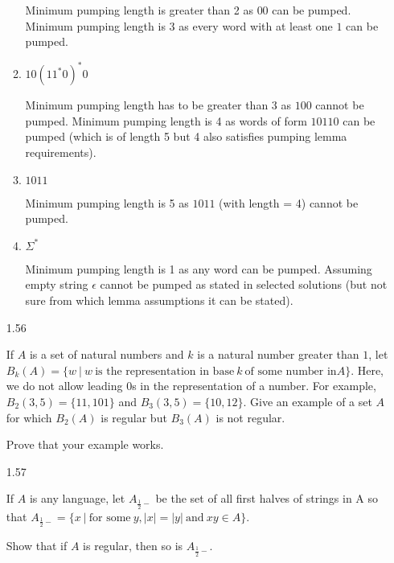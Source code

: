 \begin{enumerate}
\begin{enumerate}
                        Minimum pumping length is greater than 2 as $00$ can be pumped. Minimum pumping length is 3 as every word with at least one $1$ can be pumped.
                        
                  \item $10(11^\ast0)^\ast0$
                        
                        Minimum pumping length has to be greater than 3 as $100$ cannot be pumped. Minimum pumping length is 4 as words of form $10110$ can be pumped (which is of length 5 but 4 also satisfies pumping lemma requirements).
                        
                  \item $1011$
                        
                        Minimum pumping length is 5 as $1011$ (with length = 4) cannot be pumped.
                        
                  \item $\Sigma^\ast$
                        
                        Minimum pumping length is 1 as any word can be pumped. Assuming empty string $\epsilon$ cannot be pumped as stated in selected solutions (but not sure from which lemma assumptions it can be stated).
                        
            \end{enumerate}
            
      \item [1.56]
            
            If $A$ is a set of natural numbers and $k$ is a natural number greater than $1$, let $B_k(A)=\{w~|~w~ \text{is the representation in base}~k~\text{of some number in} A\}$. Here, we do not allow leading $0$s in the representation of a number. For example, $B_2({3,5})=\{11,101\}$ and $B_3({3,5})=\{10,12\}$. Give an example of a set $A$ for which $B_2(A)$ is regular but $B_3(A)$ is not regular. 
            
            Prove that your example works.
            
      \item [1.57]
            
            If $A$ is any language, let $A_{\frac{1}{2}-}$ be the set of all first halves of strings in A so that $A_{\frac{1}{2}-} = \{x~|~ \text{for some}~ y, |x| = |y| ~\text{and}~ xy \in A\}$. 
            
            Show that if $A$ is regular, then so is $A_{\frac{1}{2}-}$.
            

\end{enumerate}

